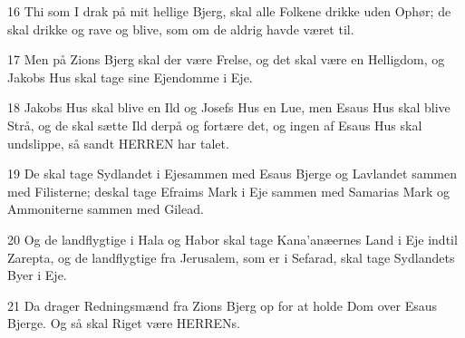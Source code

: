 \par 16 Thi som I drak på mit hellige Bjerg, skal alle Folkene drikke uden Ophør; de skal drikke og rave og blive, som om de aldrig havde været til.
\par 17 Men på Zions Bjerg skal der være Frelse, og det skal være en Helligdom, og Jakobs Hus skal tage sine Ejendomme i Eje.
\par 18 Jakobs Hus skal blive en Ild og Josefs Hus en Lue, men Esaus Hus skal blive Strå, og de skal sætte Ild derpå og fortære det, og ingen af Esaus Hus skal undslippe, så sandt HERREN har talet.
\par 19 De skal tage Sydlandet i Ejesammen med Esaus Bjerge og Lavlandet sammen med Filisterne; deskal tage Efraims Mark i Eje sammen med Samarias Mark og Ammoniterne sammen med Gilead.
\par 20 Og de landflygtige i Hala og Habor skal tage Kana'anæernes Land i Eje indtil Zarepta, og de landflygtige fra Jerusalem, som er i Sefarad, skal tage Sydlandets Byer i Eje.
\par 21 Da drager Redningsmænd fra Zions Bjerg op for at holde Dom over Esaus Bjerge. Og så skal Riget være HERRENs.


